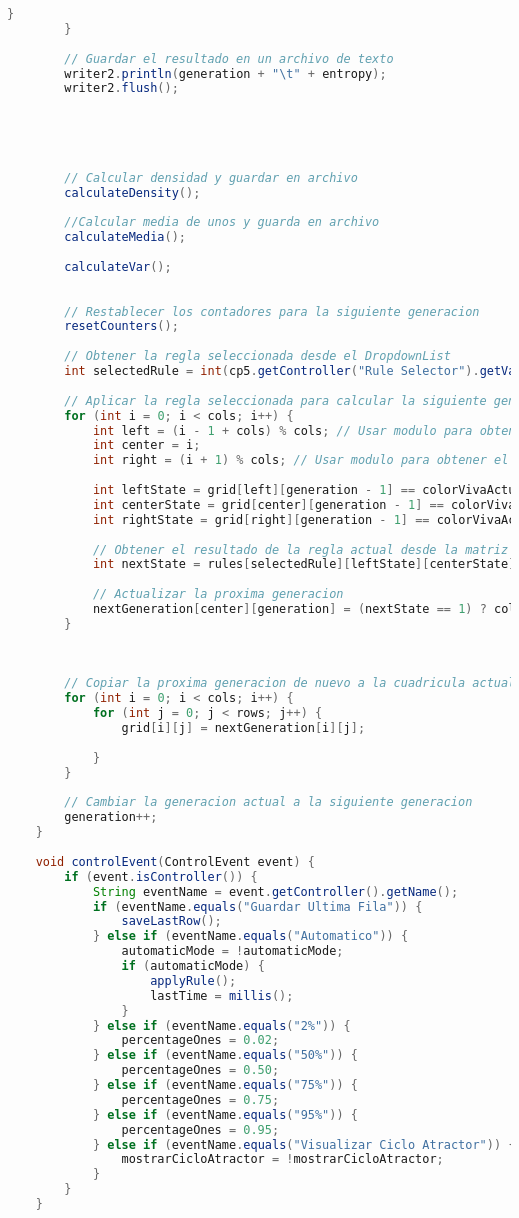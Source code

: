 \documentclass{article}
\begin{document}
\begin{lstlisting}[language=Java, basicstyle=\tiny, breaklines=true, breakatwhitespace=true]
			}
		}
		
		// Guardar el resultado en un archivo de texto
		writer2.println(generation + "\t" + entropy);
		writer2.flush();
		
		
		
		
		
		// Calcular densidad y guardar en archivo
		calculateDensity();
		
		//Calcular media de unos y guarda en archivo
		calculateMedia();
		
		calculateVar();
		
		
		// Restablecer los contadores para la siguiente generacion
		resetCounters();
		
		// Obtener la regla seleccionada desde el DropdownList
		int selectedRule = int(cp5.getController("Rule Selector").getValue());
		
		// Aplicar la regla seleccionada para calcular la siguiente generacion
		for (int i = 0; i < cols; i++) {
			int left = (i - 1 + cols) % cols; // Usar modulo para obtener el vecino izquierdo
			int center = i;
			int right = (i + 1) % cols; // Usar modulo para obtener el vecino derecho
			
			int leftState = grid[left][generation - 1] == colorVivaActual ? 1 : 0;
			int centerState = grid[center][generation - 1] == colorVivaActual ? 1 : 0;
			int rightState = grid[right][generation - 1] == colorVivaActual ? 1 : 0;
			
			// Obtener el resultado de la regla actual desde la matriz de reglas
			int nextState = rules[selectedRule][leftState][centerState][rightState];
			
			// Actualizar la proxima generacion
			nextGeneration[center][generation] = (nextState == 1) ? colorVivaActual : colorMuertaActual;
		}
		
		
		
		// Copiar la proxima generacion de nuevo a la cuadricula actual
		for (int i = 0; i < cols; i++) {
			for (int j = 0; j < rows; j++) {
				grid[i][j] = nextGeneration[i][j];
				
			}
		}
		
		// Cambiar la generacion actual a la siguiente generacion
		generation++;
	}
	
	void controlEvent(ControlEvent event) {
		if (event.isController()) {
			String eventName = event.getController().getName();
			if (eventName.equals("Guardar Ultima Fila")) {
				saveLastRow();
			} else if (eventName.equals("Automatico")) {
				automaticMode = !automaticMode;
				if (automaticMode) {
					applyRule();
					lastTime = millis();
				}
			} else if (eventName.equals("2%")) {
				percentageOnes = 0.02;
			} else if (eventName.equals("50%")) {
				percentageOnes = 0.50;
			} else if (eventName.equals("75%")) {
				percentageOnes = 0.75;
			} else if (eventName.equals("95%")) {
				percentageOnes = 0.95;
			} else if (eventName.equals("Visualizar Ciclo Atractor")) {
				mostrarCicloAtractor = !mostrarCicloAtractor;
			}
		}
	}
	

\end{lstlisting}
\end{document}
